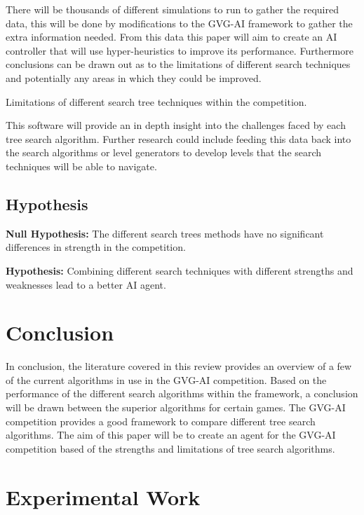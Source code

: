 \documentclass[journal]{IEEEtran}
\begin{document}
	There will be thousands of different simulations to run to gather the required data, this will be done by modifications to the GVG-AI framework to gather the extra information needed.
	From this data this paper will aim to create an AI controller that will use hyper-heuristics to improve its performance. Furthermore conclusions can be drawn out as to the limitations of different search techniques and potentially any areas in which they could be improved.
	
	Limitations of different search tree techniques within the competition.
	

	

	This software will provide an in depth insight into the challenges faced by each tree search algorithm.
	Further research could include feeding this data back into the search algorithms or level generators to develop levels that the search techniques will be able to navigate.

	
\subsection{Hypothesis}
	\textbf{Null Hypothesis:}
		The different search trees methods have no significant differences in strength in the competition.
		
	\textbf{Hypothesis:}
		Combining different search techniques with different strengths and weaknesses lead to a better AI agent.

\section{Conclusion}
	In conclusion, the literature covered in this review provides an overview of a few of the current algorithms in use in the GVG-AI competition.
	Based on the performance of the different search algorithms within the framework, a conclusion will be drawn between the superior algorithms for certain games.
	The GVG-AI competition provides a good framework to compare different tree search algorithms. 
	The aim of this paper will be to create an agent for the GVG-AI competition based of the strengths and limitations of tree search algorithms.








\section{Experimental Work}
\end{document}
